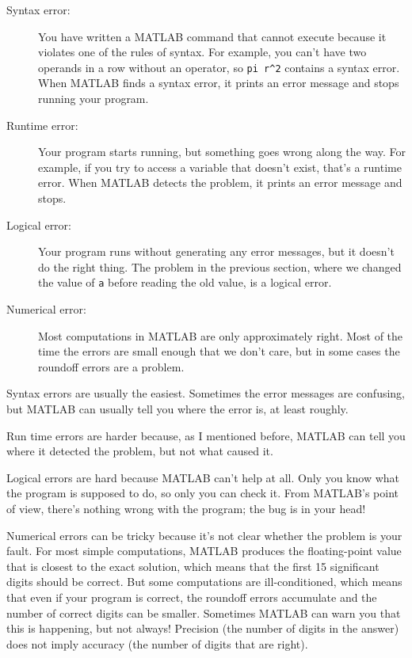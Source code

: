 \documentclass{book}
\begin{document}
\begin{description}

\item[Syntax error:] You have written a MATLAB command that cannot
execute because it violates one of the rules of syntax.  For example,
you can't have two operands in a row without an operator, so
\verb+pi r^2+ contains a syntax error.  When MATLAB finds a syntax
error, it prints an error message and stops running your program.

\item[Runtime error:] Your program starts running, but something goes
wrong along the way.  For example, if you try to access a variable
that doesn't exist, that's a runtime error.  When MATLAB detects the
problem, it prints an error message and stops.

\item[Logical error:] Your program runs without generating any error
messages, but it doesn't do the right thing.  The problem in the
previous section, where we changed the value of {\tt a} before
reading the old value, is a logical error.

\item[Numerical error:] Most computations in MATLAB are only
approximately right.  Most of the time the errors are small enough
that we don't care, but in some cases the roundoff errors are a problem.

\end{description}

Syntax errors are usually the easiest.  Sometimes the error messages
are confusing, but MATLAB can usually tell you where the error is, at
least roughly.

Run time errors are harder because, as I mentioned before, MATLAB
can tell you where it detected the problem, but not what caused it.

Logical errors are hard because MATLAB can't help at all.  Only you
know what the program is supposed to do, so only you can check it.
From MATLAB's point of view, there's nothing wrong with the program;
the bug is in your head!

Numerical errors can be tricky because it's not clear whether the
problem is your fault.  For most simple computations, MATLAB produces
the floating-point value that is closest to the exact solution, which
means that the first 15 significant digits should be correct.  But some
computations are ill-conditioned, which means that even if your program
is correct, the roundoff errors accumulate and the number of correct
digits can be smaller.  Sometimes MATLAB can warn you that
this is happening, but not always!  Precision (the number of digits
in the answer) does not imply accuracy (the number of digits that
are right).
\end{document}
